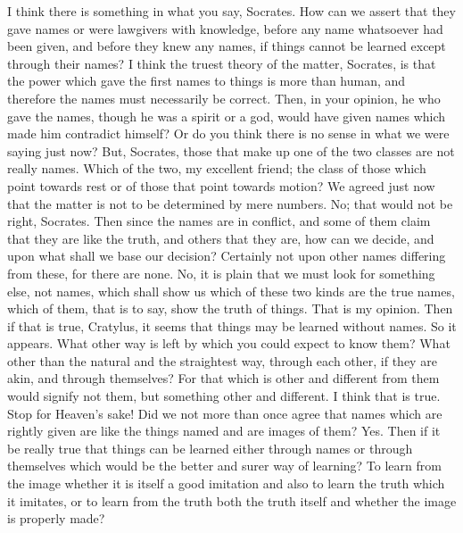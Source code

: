 {{{{{\cratylusspeaks
I think there is something in what you say, Socrates.
\socratesspeaks
How can we assert that they gave names or were lawgivers with knowledge, before any name whatsoever had been given, and before they knew any names, if things cannot be learned except through their names? 
\cratylusspeaks
I think the truest theory of the matter, Socrates, is that the power which gave the first names to things is more than human, and therefore the names must necessarily be correct.
\socratesspeaks
Then, in your opinion, he who gave the names, though he was a spirit or a god, would have given names which made him contradict himself? Or do you think there is no sense in what we were saying just now?
\cratylusspeaks
But, Socrates, those that make up one of the two classes are not really names.
\socratesspeaks
Which of the two, my excellent friend; the class of those which point towards rest or of those that point towards motion? We agreed just now that the matter is not to be determined by mere numbers. 
\cratylusspeaks
No; that would not be right, Socrates.
\socratesspeaks
Then since the names are in conflict, and some of them claim that they are like the truth, and others that they are, how can we decide, and upon what shall we base our decision? Certainly not upon other names differing from these, for there are none. No, it is plain that we must look for something else, not names, which shall show us which of these two kinds are the true names, which of them, that is to say,  show the truth of things.
\cratylusspeaks
That is my opinion.
\socratesspeaks
Then if that is true, Cratylus, it seems that things may be learned without names.
\cratylusspeaks
So it appears.
\socratesspeaks
What other way is left by which you could expect to know them? What other than the natural and the straightest way, through each other, if they are akin, and through themselves? For that which is other and different from them would signify not them, but something other and different.
\cratylusspeaks
I think that is true. 
\socratesspeaks
Stop for Heaven's sake! Did we not more than once agree that names which are rightly given are like the things named and are images of them?
\cratylusspeaks
Yes.
\socratesspeaks
Then if it be really true that things can be learned either through names or through themselves which would be the better and surer way of learning? To learn from the image whether it is itself a good imitation and also to learn the truth which it imitates,  or to learn from the truth both the truth itself and whether the image is properly made?
}}}}}
